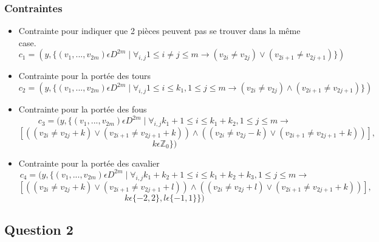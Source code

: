 \documentclass[a4paper,11pt]{article}
\begin{document}
\subsubsection{Contraintes}
\begin{itemize}
\item Contrainte pour indiquer que 2 pièces peuvent pas se trouver dans la même case.
   $$c_{1} = ( y, \{ (v_{1}, ..., v_{2m}) \epsilon  D^{2m} \mid \forall_{i,j} 1\leq i \neq j \leq m \rightarrow (v_{2i} \neq v_{2j}) \vee  (v_{2i+1} \neq v_{2j+1}) \} ) $$
\item Contrainte pour la portée des tours 
 $$ c_{2} = ( y, \{ (v_{1}, ..., v_{2m}) \epsilon  D^{2m} \mid \forall_{i,j} 1\leq i \leq k_{1}, 1\leq j \leq m  \rightarrow (v_{2i} \neq v_{2j}) \wedge  (v_{2i+1} \neq v_{2j+1}) \} ) $$

\item Contrainte pour la portée des fous 
  $$c_{3} = ( y, \{ (v_{1}, ..., v_{2m}) \epsilon  D^{2m} \mid \forall_{i,j} k_{1}+1\leq i \leq k_{1}+k_{2}, 1\leq j \leq m \rightarrow$$
  $$[ ((v_{2i} \neq v_{2j}+k) \vee  (v_{2i+1} \neq v_{2j+1}+k)) \wedge  ((v_{2i} \neq v_{2j}-k) \vee  (v_{2i+1} \neq v_{2j+1}+k)) ],$$
  $$k \epsilon \mathbb{Z}_{0} \} ) $$

\item Contrainte pour la portée des cavalier 
  $$ c_{4} = ( y, \{ (v_{1}, ..., v_{2m}) \epsilon  D^{2m} \mid \forall_{i,j} k_{1}+k_{2}+1\leq i \leq k_{1}+k_{2}+k_{3}, 1\leq j \leq m \rightarrow$$
  $$[((v_{2i} \neq v_{2j}+k) \vee  (v_{2i+1} \neq v_{2j+1}+l)) \wedge ((v_{2i} \neq v_{2j}+l) \vee  (v_{2i+1} \neq v_{2j+1}+k)) ],$$
  $$k \epsilon \{-2, 2\}, l \epsilon \{-1, 1\} \} )$$

\end{itemize}

\subsection{Question 2}
\end{document}
